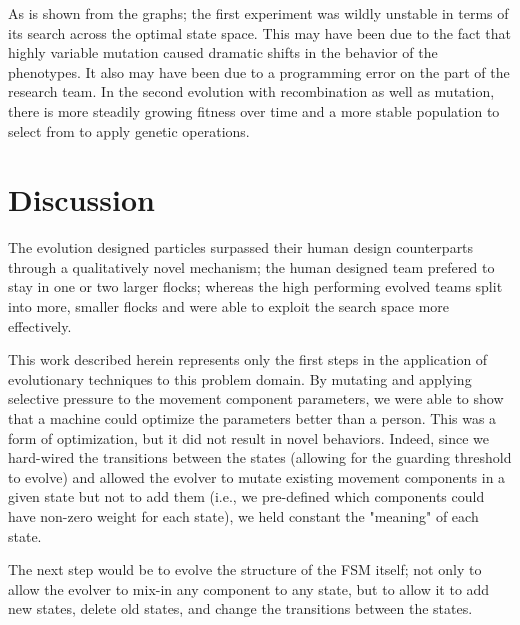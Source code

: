 \documentclass[12pt,journal,compsoc]{IEEEtran}
\begin{document}
As is shown from the graphs; the first experiment was wildly unstable in terms of its search across the optimal state space. This may have been due to the fact that highly variable mutation caused dramatic shifts in the behavior of the phenotypes. It also may have been due to a programming error on the part of the research team. In the second evolution with recombination as well as mutation, there is more steadily growing fitness over time and a more stable population to select from to apply genetic operations.

\section{Discussion}
The evolution designed particles surpassed their human design counterparts through a qualitatively novel mechanism; the human designed team prefered to stay in one or two larger flocks; whereas the high performing evolved teams split into more, smaller flocks and were able to exploit the search space more effectively.

This work described herein represents only the first steps in the application of evolutionary techniques to this problem domain. By mutating and applying selective pressure to the movement component parameters, we were able to show that a machine could optimize the parameters better than a person. This was a form of optimization, but it did not result in novel behaviors. Indeed, since we hard-wired the transitions between the states (allowing for the guarding threshold to evolve) and allowed the evolver to mutate existing movement components in a given state but not to add them (i.e., we pre-defined which components could have non-zero weight for each state), we held constant the "meaning" of each state.

The next step would be to evolve the structure of the FSM itself; not only to allow the evolver to mix-in any component to any state, but to allow it to add new states, delete old states, and change the transitions between the states.



\end{document}
